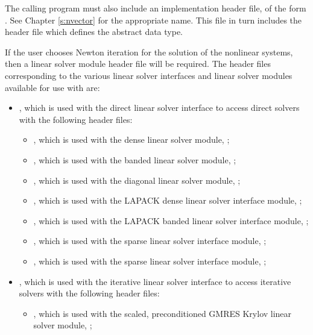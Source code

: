 The calling program must also include an {\nvector} implementation header file,
of the form .  See Chapter \ref{s:nvector}
for the appropriate name.  This file in turn includes the header file
 which defines the abstract  data type. 

If the user chooses Newton iteration for the solution of the nonlinear
systems, then a linear solver module header file will be required.
The header files corresponding to the various linear solver
interfaces and linear solver modules available for use with
{\cvode} are: 
\begin{itemize}
\item {}, 
  which is used with the {\cvdls} direct linear solver interface to
  access direct solvers with the following header files:
  \begin{itemize}
  \item {},
    which is used with the dense linear solver module,
    {\sunlinsoldense}; 
    
  \item {},
    which is used with the banded linear solver module,
    {\sunlinsolband}; 
    
  \item {},
    which is used with the diagonal linear solver module,
    {\sunlinsoldiag}; 
    
  \item {},
    which is used with the LAPACK dense linear solver interface module,
    {\sunlinsollapdense}; 
    
  \item {},
    which is used with the LAPACK banded linear solver interface module,
    {\sunlinsollapband}; 
    
  \item {},
    which is used with the {\klu} sparse linear solver interface module,
    {\sunlinsolklu}; 
    
  \item {},
    which is used with the {\superlumt} sparse linear solver interface
    module, {\sunlinsolslumt}; 
  \end{itemize}

\item {}, 
  which is used with the {\cvspils} iterative linear solver interface to
  access iterative solvers with the following header files:
  \begin{itemize}
  \item {},
    which is used with the scaled, preconditioned GMRES Krylov linear
    solver module, {\sunlinsolspgmr};
    

\end{itemize}
\end{itemize}

